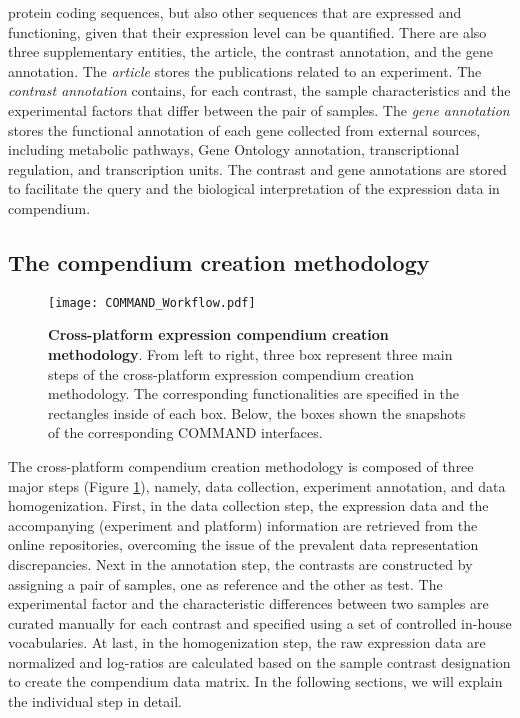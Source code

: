 protein coding sequences, but also other sequences that are expressed and
functioning, given that their expression level can be quantified.
%
There are also three supplementary entities, the article, the contrast
annotation, and the gene annotation.
%
The \textit{article} stores the publications related to an experiment.
%
The \textit{contrast annotation} contains, for each contrast, the sample
characteristics and the experimental factors that differ between the pair of
samples.
%
The \textit{gene annotation} stores the functional annotation of each gene
collected from external sources, including metabolic pathways, Gene Ontology
annotation, transcriptional regulation, and transcription units.
%
The contrast and gene annotations are stored to facilitate the query and the
biological interpretation of the expression data in compendium.






\subsection{The compendium creation methodology}
\label{sec:colombos-comp-method}

\begin{figure}
  \centering
  \texttt{[image: COMMAND\_Workflow.pdf]}
  \caption[Cross-platform expression compendium creation methodology]{
    \textbf{Cross-platform expression compendium creation methodology}.  From
    left to right, three box represent three main steps of the cross-platform
    expression compendium creation methodology.  The corresponding
    functionalities are specified in the rectangles inside of each box.
    Below, the boxes shown the snapshots of the corresponding COMMAND
    interfaces.}
  \label{fig:command-workflow}
\end{figure}


The cross-platform compendium creation methodology is composed of three major
steps (Figure \ref{fig:command-workflow}), namely, data collection, experiment
annotation, and data homogenization.
%
First, in the data collection step, the expression data and the accompanying
(experiment and platform) information are retrieved from the online
repositories, overcoming the issue of the prevalent data representation
discrepancies.
%
Next in the annotation step, the contrasts are constructed by assigning a pair of
samples, one as reference and the other as test.  The experimental factor and
the characteristic differences between two samples are curated manually for
each contrast and specified using a set of controlled in-house vocabularies.
%
At last, in the homogenization step, the raw expression data are normalized
and log-ratios are calculated based on the sample contrast designation to
create the compendium data matrix.
%
In the following sections, we will explain the individual step in detail.






